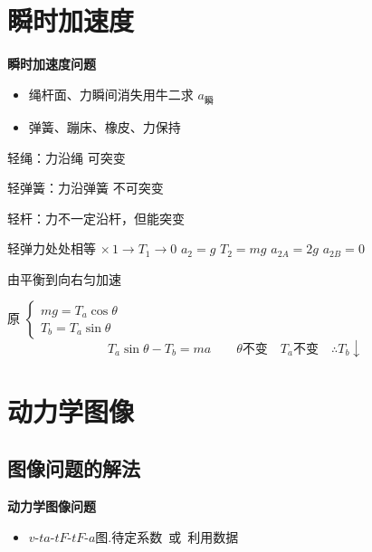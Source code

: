 

\section{瞬时加速度}
\textbf{瞬时加速度问题}
\begin{itemize}
\item 绳杆面、力瞬间消失\quad 用牛二求 $a_{\text{瞬}}$
\item 弹簧、蹦床、橡皮、力保持
\end{itemize}

轻绳：力沿绳 可突变\par
轻弹簧：力沿弹簧 不可突变\par
轻杆：力不一定沿杆，但能突变\par
轻弹力处处相等 %
$\times\,1\to T_1\to0$ \qquad $a_2=g$ \qquad $T_2=mg$ \qquad $a_{2A}=2g$ \qquad $a_{2B}=0$

\begin{problem}[2]
由平衡到向右匀加速
\begin{solution}
原
$\begin{cases} mg=T_a\cos\theta\\ T_b=T_a\sin\theta \end{cases}$
\[ T_a\sin\theta-T_b=ma\qquad\theta\text{不变}\quad T_a\text{不变}\quad\therefore T_b\downarrow \]
\end{solution}
\end{problem}


\section{动力学图像}
\subsection{图像问题的解法}
\textbf{动力学图像问题}
\begin{itemize}
\item $v$-$t$\quad $a$-$t$\quad $F$-$t$\quad $F$-$a$图.\quad 待定系数\ 或\ 利用数据
\end{itemize}

